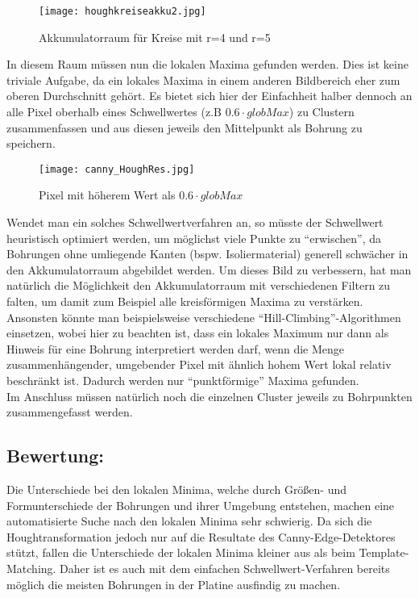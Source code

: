 \begin{figure}[H]
  \begin{center}
    \texttt{[image: houghkreiseakku2.jpg]}
    \caption{Akkumulatorraum für Kreise mit r=4 und r=5}
    \label{fig:houghkreiseakku2}
  \end{center}
\end{figure}

In diesem Raum müssen nun die lokalen Maxima gefunden werden. Dies ist keine triviale Aufgabe, da ein lokales Maxima in einem anderen Bildbereich eher zum oberen Durchschnitt gehört. Es bietet sich hier der Einfachheit halber dennoch an alle Pixel oberhalb eines Schwellwertes (z.B $0.6 \cdot globMax$) zu Clustern zusammenfassen und aus diesen jeweils den Mittelpunkt als Bohrung zu speichern. 

\begin{figure}[H]
  \begin{center}
    \texttt{[image: canny\_HoughRes.jpg]}
    \caption{Pixel mit höherem Wert als $0.6 \cdot globMax$}
    \label{fig:houghkreiseakku2}
  \end{center}
\end{figure}

Wendet man ein solches Schwellwertverfahren an, so müsste der Schwellwert heuristisch optimiert werden, um möglichst viele Punkte zu "`erwischen"', da Bohrungen ohne umliegende Kanten (bspw. Isoliermaterial) generell schwächer in den Akkumulatorraum abgebildet werden. \newline
Um dieses Bild zu verbessern, hat man natürlich die Möglichkeit den Akkumulatorraum mit verschiedenen Filtern zu falten, um damit zum Beispiel alle kreisförmigen Maxima zu verstärken. \newline
Ansonsten könnte man beispielsweise verschiedene  "`Hill-Climbing"'-Algorithmen einsetzen, wobei hier zu beachten ist, dass ein lokales Maximum nur dann als Hinweis für eine Bohrung interpretiert werden darf, wenn die Menge zusammenhängender, umgebender Pixel mit ähnlich hohem Wert lokal relativ beschränkt ist. Dadurch werden nur "`punktförmige"' Maxima gefunden. \\
Im Anschluss müssen natürlich noch die einzelnen Cluster jeweils zu Bohrpunkten zusammengefasst werden.

\subsection{Bewertung:}
Die Unterschiede bei den lokalen Minima, welche durch Größen- und Formunterschiede der Bohrungen und ihrer Umgebung entstehen, machen eine automatisierte Suche nach den lokalen Minima sehr schwierig. Da sich die Houghtransformation jedoch nur auf die Resultate des Canny-Edge-Detektores stützt, fallen die Unterschiede der lokalen Minima kleiner aus als beim Template-Matching. Daher ist es auch mit dem einfachen Schwellwert-Verfahren bereits möglich die meisten Bohrungen in der Platine ausfindig zu machen.

